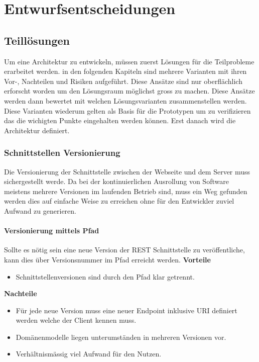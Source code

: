 \chapter{Entwurfsentscheidungen}

\section{Teillösungen}

Um eine Architektur zu entwickeln, müssen zuerst Lösungen für die Teilprobleme erarbeitet werden. in den folgenden Kapiteln sind mehrere Varianten mit ihren Vor-, Nachteilen und Risiken aufgeführt. Diese Ansätze sind nur oberflächlich erforscht worden um den Lösungsraum möglichst gross zu machen. Diese Ansätze werden dann bewertet mit welchen Lösungsvarianten zusammenstellen werden. Diese Varianten wiederum gelten als Basis für die Prototypen um zu verifizieren das die wichigten Punkte eingehalten werden können. Erst danach wird die Architektur definiert.

\subsection{Schnittstellen Versionierung}

Die Versionierung der Schnittstelle zwischen der Webseite und dem Server muss sichergestellt werde. Da bei der kontinuierlichen Ausrollung von Software meistens mehrere Versionen im laufenden Betrieb sind, muss ein Weg gefunden werden dies auf einfache Weise zu erreichen ohne für den Entwickler zuviel Aufwand zu generieren.

\subsubsection{Versionierung mittels Pfad}

Sollte es nötig sein eine neue Version der \Gls{REST} Schnittstelle zu veröffentliche, kann dies über Versionsnummer im Pfad erreicht werden. 
\newline
\newline
\textbf{Vorteile}
\begin{itemize}
	\item Schnittstellenversionen sind durch den Pfad klar getrennt.
\end{itemize}
\textbf{Nachteile}
\begin{itemize}
	\item Für jede neue Version muss eine neuer Endpoint inklusive URI definiert werden welche der Client kennen muss.
	\item Domänenmodelle liegen unterumständen in mehreren Versionen vor.
	\item Verhältnismässig viel Aufwand für den Nutzen.
\end{itemize}

